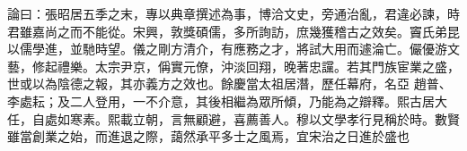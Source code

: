 \begin{pinyinscope}
 論曰：張昭居五季之末，專以典章撰述為事，博洽文史，旁通治亂，君違必諫，時君雖嘉尚之而不能從。宋興，敦獎碩儒，多所詢訪，庶幾獲稽古之效矣。竇氏弟昆以儒學進，並馳時望。儀之剛方清介，有應務之才，將試大用而遽淪亡。儼優游文藝，修起禮樂。太宗尹京，偁實元僚，沖淡回翔，晚著忠讜。若其門族宦業之盛，世或以為陰德之報，其亦義方之效也。餘慶當太祖居潛，歷任幕府，名亞
 趙普、李處耘；及二人登用，一不介意，其後相繼為眾所傾，乃能為之辯釋。熙古居大任，自處如寒素。熙載立朝，言無顧避，喜薦善人。穆以文學孝行見稱於時。數賢雖當創業之始，而進退之際，藹然承平多士之風焉，宜宋治之日進於盛也



\end{pinyinscope}